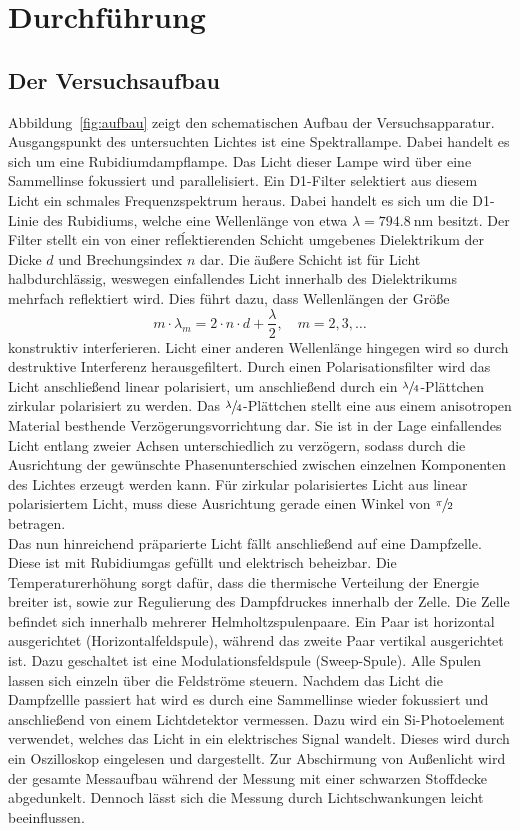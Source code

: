 \documentclass[
  bibliography=totoc,     %
  captions=tableheading,  %
  titlepage=firstiscover, %
]{scrartcl}
\begin{document}
\section{Durchführung}
\label{sec:durchführung}

\subsection{Der Versuchsaufbau}

Abbildung~\ref{fig:aufbau} zeigt den schematischen Aufbau der Versuchsapparatur.
Ausgangspunkt des untersuchten Lichtes ist eine Spektrallampe. Dabei handelt es
sich um eine Rubidiumdampflampe. Das Licht dieser Lampe wird über eine
Sammellinse fokussiert und parallelisiert. Ein D1-Filter selektiert aus diesem
Licht ein schmales Frequenzspektrum heraus. Dabei handelt es sich um die
D1-Linie des Rubidiums, welche eine Wellenlänge von etwa
$\lambda=\SI{794.8}{\nano\metre}$ besitzt. Der Filter stellt ein von einer
refĺektierenden Schicht umgebenes Dielektrikum der Dicke $d$ und
Brechungsindex $n$ dar. Die äußere Schicht ist für Licht halbdurchlässig,
weswegen einfallendes Licht innerhalb des Dielektrikums mehrfach reflektiert
wird. Dies führt dazu, dass Wellenlängen der Größe
%
\begin{equation}
  m\cdot\lambda_m=2\cdot n\cdot d+\frac{\lambda}{2}, \quad m=2,3,\ldots
\end{equation}
%
konstruktiv interferieren. Licht einer anderen Wellenlänge hingegen wird so
durch destruktive Interferenz herausgefiltert. Durch einen Polarisationsfilter
wird das Licht anschließend linear polarisiert, um anschließend durch ein
$\sfrac{\lambda}{4}$-Plättchen zirkular polarisiert zu werden. Das
$\sfrac{\lambda}{4}$-Plättchen stellt eine aus einem anisotropen Material
besthende Verzögerungsvorrichtung dar. Sie ist in der Lage einfallendes Licht
entlang zweier Achsen unterschiedlich zu verzögern, sodass durch die Ausrichtung
der gewünschte Phasenunterschied zwischen einzelnen Komponenten des Lichtes
erzeugt werden kann. Für zirkular polarisiertes Licht aus linear polarisiertem Licht,
muss diese Ausrichtung gerade einen Winkel von $\sfrac{\pi}{2}$ betragen. \\ Das
nun hinreichend präparierte Licht fällt anschließend auf eine Dampfzelle. Diese
ist mit Rubidiumgas gefüllt und elektrisch beheizbar. Die Temperaturerhöhung
sorgt dafür, dass die thermische Verteilung der Energie breiter ist, sowie zur
Regulierung des Dampfdruckes innerhalb der Zelle. Die Zelle befindet sich
innerhalb mehrerer Helmholtzspulenpaare. Ein Paar ist horizontal ausgerichtet
(Horizontalfeldspule), während das zweite Paar vertikal ausgerichtet ist. Dazu
geschaltet ist eine Modulationsfeldspule (Sweep-Spule). Alle Spulen lassen sich
einzeln über die Feldströme steuern. Nachdem das Licht die Dampfzellle passiert
hat wird es durch eine Sammellinse wieder fokussiert und anschließend von einem
Lichtdetektor vermessen. Dazu wird ein Si-Photoelement verwendet, welches das
Licht in ein elektrisches Signal wandelt. Dieses wird durch ein Oszilloskop
eingelesen und dargestellt. Zur Abschirmung von Außenlicht wird der gesamte
Messaufbau während der Messung mit einer schwarzen Stoffdecke abgedunkelt.
Dennoch lässt sich die Messung durch Lichtschwankungen leicht beeinflussen.
\end{document}
